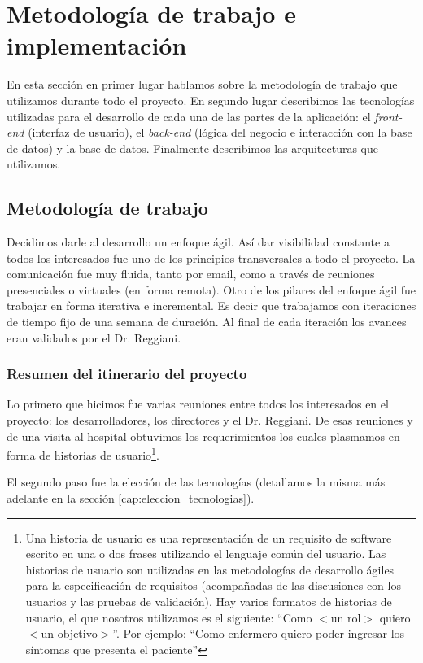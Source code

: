 \section{Metodología de trabajo e implementación}
En esta sección en primer lugar hablamos sobre la metodología de trabajo que utilizamos durante todo el proyecto. En segundo lugar describimos las tecnologías utilizadas para el desarrollo de cada una de las partes de la aplicación: el \textit{front-end} (interfaz de usuario), el \textit{back-end} (lógica del negocio e interacción con la base de datos) y la base de datos. Finalmente describimos las arquitecturas que utilizamos.

\subsection{Metodología de trabajo}
Decidimos darle al desarrollo un enfoque ágil\cite{Shore}. Así dar visibilidad constante a todos los interesados fue uno de los principios transversales a todo el proyecto. La comunicación fue muy fluida, tanto por email, como a través de reuniones presenciales o virtuales (en forma remota). Otro de los pilares del enfoque ágil fue trabajar en forma iterativa e incremental. Es decir que trabajamos con iteraciones de tiempo fijo de una semana de duración. Al final de cada iteración los avances eran validados por el Dr. Reggiani.

\subsubsection{Resumen del itinerario del proyecto}\label{cap:itinerario}
Lo primero que hicimos fue varias reuniones entre todos los interesados en el proyecto: los desarrolladores, los directores y el Dr. Reggiani. De esas reuniones y de una visita al hospital obtuvimos los requerimientos los cuales plasmamos en forma de historias de usuario\footnote{Una historia de usuario es una representación de un requisito de software escrito en una o dos frases utilizando el lenguaje común del usuario. Las historias de usuario son utilizadas en las metodologías de desarrollo ágiles para la especificación de requisitos (acompañadas de las discusiones con los usuarios y las pruebas de validación). Hay varios formatos de historias de usuario, el que nosotros utilizamos es el siguiente: ``Como  $<$un rol$>$ quiero $<$un objetivo$>$''. Por ejemplo: ``Como enfermero quiero poder ingresar los síntomas que presenta el paciente''}.

El segundo paso fue la elección de las tecnologías (detallamos la misma más adelante en la sección \ref{cap:eleccion_tecnologias}).

